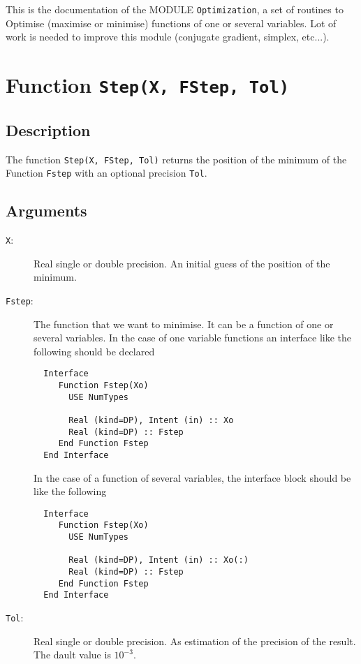 
This is the documentation of the MODULE \texttt{Optimization}, a set
of routines to Optimise (maximise or minimise) functions of one or
several variables. Lot of work is needed to improve this module
(conjugate gradient, simplex, etc...).

\section{Function \texttt{Step(X, FStep, Tol) }}

\subsection{Description}

The function \texttt{Step(X, FStep, Tol)} returns the position of the
minimum of the Function \texttt{Fstep} with an optional precision
\texttt{Tol}. 

\subsection{Arguments}

\begin{description}
\item[\texttt{X}:] Real single or double precision. An initial guess
  of the position of the minimum.
\item[\texttt{Fstep}:]  The function that we want to minimise. It can
  be a function of one or several variables. In the case of one
  variable functions an interface like the following should be
  declared
\begin{verbatim}
  Interface
     Function Fstep(Xo)
       USE NumTypes
       
       Real (kind=DP), Intent (in) :: Xo
       Real (kind=DP) :: Fstep
     End Function Fstep
  End Interface
\end{verbatim}
  In the case of a function of several variables, the interface block
  should be like the following
\begin{verbatim}
  Interface
     Function Fstep(Xo)
       USE NumTypes
       
       Real (kind=DP), Intent (in) :: Xo(:)
       Real (kind=DP) :: Fstep
     End Function Fstep
  End Interface
\end{verbatim}

\item[\texttt{Tol}:] Real single or double precision. As estimation of
  the precision of the result. The dault value is $10^{-3}$.
  
\end{description}

